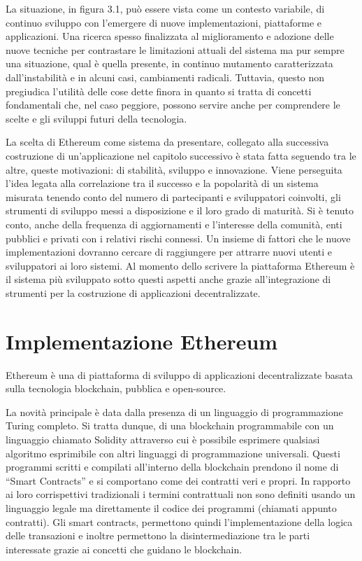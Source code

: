 La situazione, in figura 3.1, può essere vista come un contesto variabile, di continuo sviluppo con l’emergere di nuove implementazioni, piattaforme e applicazioni. Una ricerca spesso finalizzata al miglioramento e adozione delle nuove tecniche per contrastare le limitazioni attuali del sistema ma pur sempre una situazione, qual è quella presente, in continuo mutamento caratterizzata dall'instabilità e in alcuni casi, cambiamenti radicali. Tuttavia, questo non pregiudica l’utilità delle cose dette finora in quanto si tratta di concetti fondamentali che, nel caso peggiore, possono servire anche per comprendere le scelte e gli sviluppi futuri della tecnologia.

La scelta di Ethereum come sistema da presentare, collegato alla successiva costruzione di un’applicazione nel capitolo successivo è stata fatta seguendo tra le altre, queste motivazioni: di stabilità, sviluppo e innovazione. Viene perseguita l'idea legata alla correlazione tra il successo e la popolarità di un sistema misurata tenendo conto del numero di partecipanti e sviluppatori coinvolti, gli strumenti di sviluppo messi a disposizione e il loro grado di maturità. Si è tenuto conto, anche della frequenza di aggiornamenti e l’interesse della comunità, enti pubblici e privati con i relativi rischi connessi. Un insieme di fattori che le nuove implementazioni dovranno cercare di raggiungere per attrarre nuovi utenti e sviluppatori ai loro sistemi. Al momento dello scrivere la piattaforma Ethereum è il sistema più sviluppato sotto questi aspetti anche grazie all'integrazione di strumenti per la costruzione di applicazioni decentralizzate.

\section{Implementazione Ethereum}

Ethereum è una di piattaforma di sviluppo di applicazioni decentralizzate basata sulla tecnologia blockchain, pubblica e open-source.

La novità principale è data dalla presenza di un linguaggio di programmazione Turing completo. Si tratta dunque, di una blockchain programmabile con un linguaggio chiamato Solidity attraverso cui è possibile esprimere qualsiasi algoritmo esprimibile con altri linguaggi di programmazione universali. Questi programmi scritti e compilati all’interno della blockchain prendono il nome di “Smart Contracts” e si comportano come dei contratti veri e propri. In rapporto ai loro corrispettivi tradizionali i termini contrattuali non sono definiti usando un linguaggio legale ma direttamente il codice dei programmi (chiamati appunto contratti). Gli smart contracts, permettono quindi l’implementazione della logica delle transazioni e inoltre permettono la disintermediazione tra le parti interessate grazie ai concetti che guidano le blockchain. 

